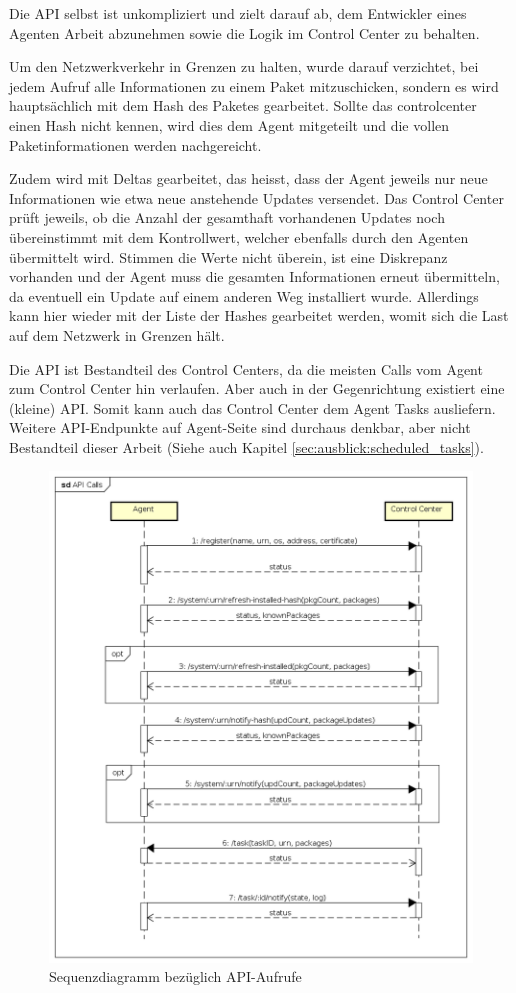 Die API selbst ist unkompliziert und zielt darauf ab, dem Entwickler eines Agenten Arbeit abzunehmen sowie die Logik im Control Center zu behalten.

Um den Netzwerkverkehr in Grenzen zu halten, wurde darauf verzichtet, bei jedem Aufruf alle Informationen zu einem Paket mitzuschicken, sondern es wird hauptsächlich mit dem Hash des Paketes gearbeitet. Sollte das \gls{controlcenter} einen Hash nicht kennen, wird dies dem Agent mitgeteilt und die vollen Paketinformationen werden nachgereicht.

Zudem wird mit Deltas gearbeitet, das heisst, dass der Agent jeweils nur neue Informationen wie etwa neue anstehende Updates versendet. Das Control Center prüft jeweils, ob die Anzahl der gesamthaft vorhandenen Updates noch übereinstimmt mit dem Kontrollwert, welcher ebenfalls durch den Agenten übermittelt wird. Stimmen die Werte nicht überein, ist eine Diskrepanz vorhanden und der Agent muss die gesamten Informationen erneut übermitteln, da eventuell ein Update auf einem anderen Weg installiert wurde. Allerdings kann hier wieder mit der Liste der Hashes gearbeitet werden, womit sich die Last auf dem Netzwerk in Grenzen hält.

Die API ist Bestandteil des Control Centers, da die meisten Calls vom Agent zum Control Center hin verlaufen. Aber auch in der Gegenrichtung existiert eine (kleine) API. Somit kann auch das Control Center dem Agent Tasks ausliefern. Weitere API-Endpunkte auf Agent-Seite sind durchaus denkbar, aber nicht Bestandteil dieser Arbeit (Siehe auch Kapitel \ref{sec:ausblick:scheduled_tasks}).

\begin{figure}
  \centering
    \includegraphics[width=\textwidth]{files/API_Calls}
  \caption{Sequenzdiagramm bezüglich API-Aufrufe}
  \label{fig:api_sequence_diagram}
\end{figure}

